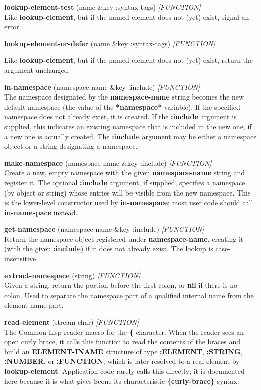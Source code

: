 \documentclass[titlepage,twoside,openright,11pt]{article}
\begin{document}
\textbf{lookup-element-test} (name \&key :syntax-tags)
\emph{{[}FUNCTION{]}}\\
Like \textbf{lookup-element}, but if the named element does not (yet)
exist, signal an error.

\textbf{lookup-element-or-defer} (name \&key :syntax-tags)
\emph{{[}FUNCTION{]}}

Like \textbf{lookup-element}, but if the named element does not (yet)
exist, return the argument unchanged.

\textbf{in-namespace} (namespace-name \&key :include)
\emph{{[}FUNCTION{]}}\\
The namespace designated by the \textbf{namespace-name} string becomes
the new default namespace (the value of the \textbf{*namespace*}
variable). If the specified namespace does not already exist, it is
created. If the \textbf{:include} argument is supplied, this indicates
an existing namespace that is included in the new one, if a new one is
actually created. The \textbf{:include} argument may be either a
namespace object or a string designating a namespace.

\textbf{make-namespace} (namespace-name \&key :include)
\emph{{[}FUNCTION{]}}\\
Create a new, empty namespace with the given \textbf{namespace-name}
string and register it. The optional \textbf{:include} argument, if
supplied, specifies a namespace (by object or string) whose entries
will be visible from the new namespace. This is the lower-level
constructor used by \textbf{in-namespace}; most user code should call
\textbf{in-namespace} instead.

\textbf{get-namespace} (namespace-name \&key :include)
\emph{{[}FUNCTION{]}}\\
Return the namespace object registered under \textbf{namespace-name},
creating it (with the given \textbf{:include}) if it does not already
exist. The lookup is case-insensitive.

\textbf{extract-namespace} (string) \emph{{[}FUNCTION{]}}\\
Given a string, return the portion before the first colon, or
\textbf{nil} if there is no colon. Used to separate the namespace part
of a qualified internal name from the element-name part.

\textbf{read-element} (stream char) \emph{{[}FUNCTION{]}}\\
The Common Lisp reader macro for the \textbf{\{} character. When the
reader sees an open curly brace, it calls this function to read the
contents of the braces and build an \textbf{ELEMENT-INAME} structure
of type \textbf{:ELEMENT}, \textbf{:STRING}, \textbf{:NUMBER}, or
\textbf{:FUNCTION}, which is later resolved to a real element by
\textbf{lookup-element}. Application code rarely calls this directly;
it is documented here because it is what gives Scone its characteristic
\textbf{\{curly-brace\}} syntax.
\end{document}

